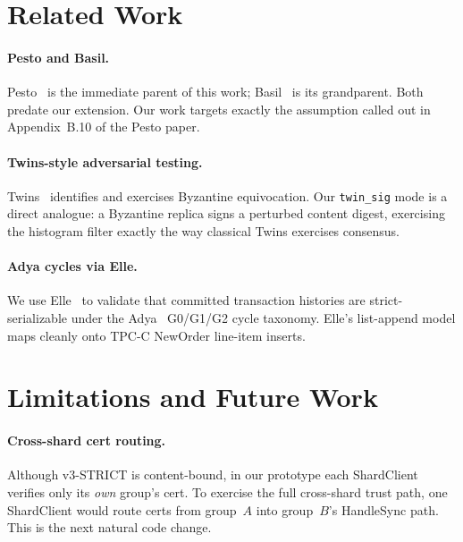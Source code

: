 \documentclass[letterpaper,twocolumn,10pt]{article}
\begin{document}
\section{Related Work}

\paragraph{Pesto and Basil.} Pesto~\cite{pesto25} is the immediate
parent of this work; Basil~\cite{basil21} is its grandparent. Both
predate our extension. Our work targets exactly the assumption
called out in Appendix~B.10 of the Pesto paper.

\paragraph{Twins-style adversarial testing.} Twins~\cite{twins21}
identifies and exercises Byzantine equivocation. Our \texttt{twin\_sig}
mode is a direct analogue: a Byzantine replica signs a perturbed
content digest, exercising the histogram filter exactly the way
classical Twins exercises consensus.

\paragraph{Adya cycles via Elle.} We use Elle~\cite{elle} to validate
that committed transaction histories are strict-serializable
under the Adya~\cite{adya99} G0/G1/G2 cycle taxonomy. Elle's
list-append model maps cleanly onto TPC-C NewOrder line-item
inserts.


\section{Limitations and Future Work}

\paragraph{Cross-shard cert routing.} Although v3-STRICT is
content-bound, in our prototype each ShardClient verifies only its
\emph{own} group's cert. To exercise the full cross-shard trust
path, one ShardClient would route certs from group~$A$ into group~$B$'s
HandleSync path. This is the next natural code change.
\end{document}
